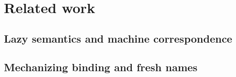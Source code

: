 \chapter{Related work}
\label{chap:related-work}

\section{Lazy semantics and machine correspondence}

\section{Mechanizing binding and fresh names}
